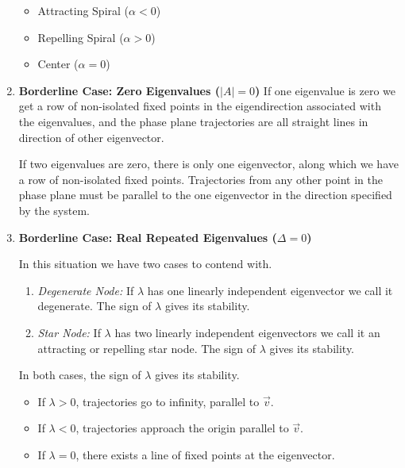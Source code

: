 \begin{enumerate}
                \begin{itemize}
                    \item Attracting Spiral ($\alpha < 0$)
                    \item Repelling Spiral ($\alpha > 0$)
                    \item Center ($\alpha = 0$)
                \end{itemize}

            \item \textbf{Borderline Case: Zero Eigenvalues ($|A| = 0$)}
                If one eigenvalue is zero we get a row of non-isolated fixed points in the eigendirection associated with the eigenvalues, and the phase plane trajectories are all straight lines in direction of other eigenvector.

                If two eigenvalues are zero, there is only one eigenvector, along which we have a row of non-isolated fixed points. Trajectories from any other point in the phase plane must be parallel to the one eigenvector in the direction specified by the system.

            \item \textbf{Borderline Case: Real Repeated Eigenvalues ($\Delta = 0$)}

                In this situation we have two cases to contend with.

                \begin{enumerate}
                    \item \textit{Degenerate Node:} If $\lambda$ has one linearly independent eigenvector we call it degenerate. The sign of $\lambda$ gives its stability.
                    \item \textit{Star Node:} If $\lambda$ has two linearly independent eigenvectors we call it an attracting or repelling star node. The sign of $\lambda$ gives its stability.
                \end{enumerate}

                In both cases, the sign of $\lambda$ gives its stability.

                    \begin{itemize}
                        \item If $\lambda > 0$, trajectories go to infinity, parallel to $\vec{v}$.
                        \item If $\lambda < 0$, trajectories approach the origin parallel to $\vec{v}$.
                        \item If $\lambda = 0$, there exists a line of fixed points at the eigenvector.
                    \end{itemize}
    \end{enumerate}

